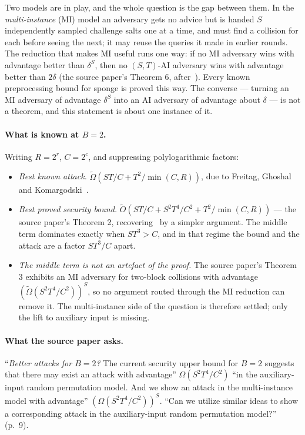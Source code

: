 \documentclass{aicr-conjecture}
\newcommand{\tO}{\tilde{O}}
\newcommand{\tOm}{\tilde{\Omega}}
\begin{document}
Two models are in play, and the whole question is the gap between them.
In the \emph{multi-instance} (MI) model an adversary gets no advice but
is handed $S$ independently sampled challenge salts one at a time, and
must find a collision for each before seeing the next; it may reuse the
queries it made in earlier rounds. The reduction that makes MI useful
runs one way: if no MI adversary wins with advantage better than
$\delta^{S}$, then no $(S,T)$-AI adversary wins with advantage better
than $2\delta$ (the source paper's Theorem 6, after~\cite{AGL22}). Every
known preprocessing bound for sponge is proved this way. The converse
--- turning an MI adversary of advantage $\delta^{S}$ into an AI
adversary of advantage about $\delta$ --- is not a theorem, and this
statement is about one instance of it.

\paragraph{What is known at $B = 2$.}
Writing $R = 2^{r}$, $C = 2^{c}$, and suppressing polylogarithmic
factors:

\begin{itemize}
\item \emph{Best known attack.} $\tOm(ST/C + T^{2}/\min(C,R))$, due to
  Freitag, Ghoshal and Komargodski~\cite{FGK22}.
\item \emph{Best proved security bound.}
  $\tO(ST/C + S^{2}T^{4}/C^{2} + T^{2}/\min(C,R))$ --- the source
  paper's Theorem 2, recovering~\cite{FGK22} by a simpler argument. The
  middle term dominates exactly when $ST^{3} > C$, and in that regime
  the bound and the attack are a factor $ST^{3}/C$ apart.
\item \emph{The middle term is not an artefact of the proof.} The
  source paper's Theorem 3 exhibits an MI adversary for two-block
  collisions with advantage $(\tOm(S^{2}T^{4}/C^{2}))^{S}$, so no
  argument routed through the MI reduction can remove it. The
  multi-instance side of the question is therefore settled; only the
  lift to auxiliary input is missing.
\end{itemize}

\paragraph{What the source paper asks.}
``\emph{Better attacks for $B = 2$?} The current security upper bound
for $B = 2$ suggests that there may exist an attack with advantage''
$\Omega(S^{2}T^{4}/C^{2})$ ``in the auxiliary-input random permutation
model. And we show an attack in the multi-instance model with
advantage'' $(\Omega(S^{2}T^{4}/C^{2}))^{S}$. ``Can we utilize similar
ideas to show a corresponding attack in the auxiliary-input random
permutation model?'' (p.~9).
\end{document}

